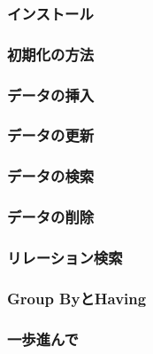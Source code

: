 
\subsubsection{インストール}

\subsubsection{初期化の方法}

\subsubsection{データの挿入}

\subsubsection{データの更新}

\subsubsection{データの検索}

\subsubsection{データの削除}

\subsubsection{リレーション検索}

\subsubsection{Group ByとHaving}

\subsubsection{一歩進んで}

